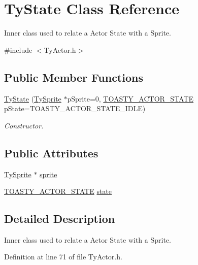 \hypertarget{class_ty_state}{
\section{TyState Class Reference}
\label{class_ty_state}
}


Inner class used to relate a Actor State with a Sprite.  




{\ttfamily \#include $<$TyActor.h$>$}

\subsection*{Public Member Functions}
\begin{DoxyCompactItemize}
\item 
\hyperlink{class_ty_state_aae77af31810df05e1465007722c3d117}{TyState} (\hyperlink{class_ty_sprite}{TySprite} $\ast$pSprite=0, \hyperlink{_ty_actor_8h_aceba83227db82b051b04ff8e90d63a51}{TOASTY\_\-ACTOR\_\-STATE} pState=TOASTY\_\-ACTOR\_\-STATE\_\-IDLE)
\begin{DoxyCompactList}\small\item\em Constructor. \end{DoxyCompactList}\end{DoxyCompactItemize}
\subsection*{Public Attributes}
\begin{DoxyCompactItemize}
\item 
\hyperlink{class_ty_sprite}{TySprite} $\ast$ \hyperlink{class_ty_state_ab5d3cefc34c39a1a5da4ba9ab0d74724}{sprite}
\item 
\hyperlink{_ty_actor_8h_aceba83227db82b051b04ff8e90d63a51}{TOASTY\_\-ACTOR\_\-STATE} \hyperlink{class_ty_state_a3402423b601dbc4a154bdebac2bb56b4}{state}
\end{DoxyCompactItemize}


\subsection{Detailed Description}
Inner class used to relate a Actor State with a Sprite. 

Definition at line 71 of file TyActor.h.




